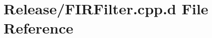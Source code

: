 \hypertarget{_release_2_f_i_r_filter_8cpp_8d}{\section{\-Release/\-F\-I\-R\-Filter.cpp.\-d \-File \-Reference}
\label{_release_2_f_i_r_filter_8cpp_8d}
}
